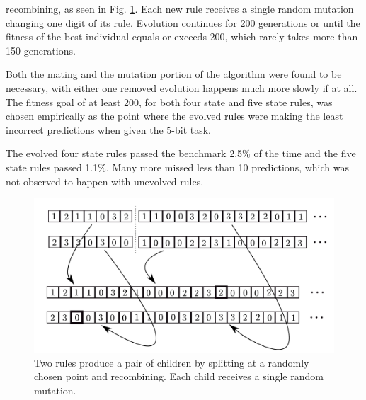 \documentclass{elsarticle}
\begin{document}
\begin{multicols}{2}
	recombining, as seen in Fig.  \ref{GA}. Each new rule receives a 
	single random mutation changing one digit of its rule.  Evolution 
	continues for 200 generations or until the fitness of the best 
	individual equals or exceeds 200, which rarely takes more than 150 
	generations.  \par Both the mating and the mutation portion of the 
	algorithm were found to be necessary, with either one removed 
	evolution happens much more slowly if at all. The fitness goal of 
	at least 200, for both four state and five state rules, was chosen 
	empirically as the point where the evolved rules were making the 
	least incorrect predictions when given the 5-bit task.  \par
	The evolved four state rules passed the benchmark 2.5\% of the time and 
	the five state rules passed 1.1\%. Many more missed less than 10 
	predictions, which was not observed to happen with unevolved rules.
	
	
	
	
	\begin{figure}[H]
		\centering
		\includegraphics[width=\linewidth]{GA.pdf}
		\caption{Two rules produce a pair of children by splitting at a randomly 
			chosen point and recombining. Each child receives a single random 
		mutation.}
		\label{GA}
	\end{figure}
	

\end{multicols}
\end{document}
